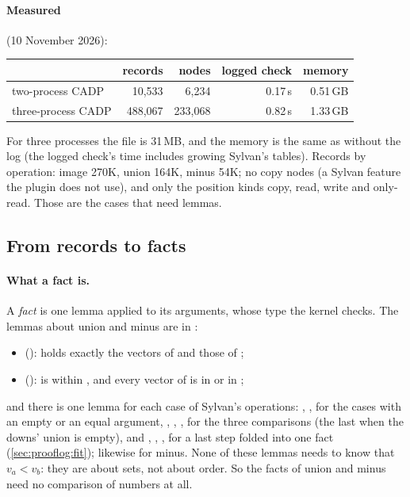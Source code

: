 \paragraph{Measured} (10 November 2026):

\begin{center}
\small
\begin{tabular}{@{}lrrrr@{}}
\toprule
 & records & nodes & logged check & memory \\
\midrule
two-process CADP & 10,533 & 6,234 & 0.17\,s & 0.51\,GB \\
three-process CADP & 488,067 & 233,068 & 0.82\,s & 1.33\,GB \\
\bottomrule
\end{tabular}
\end{center}

For three processes the file is 31\,MB, and the memory is the same as
without the log (the logged check's time includes growing Sylvan's
tables). Records by operation: image 270K, union 164K, minus 54K; no copy
nodes (a Sylvan feature the plugin does not use), and only the position
kinds copy, read, write and only-read. Those are the cases that need
lemmas.

\subsection{From records to facts}\label{sec:prooflog:facts}

\paragraph{What a fact is.} A \emph{fact} is one lemma applied to its
arguments, whose type the kernel checks. The lemmas about union and minus
are in :
\begin{itemize}
\item {} ():  holds exactly
  the vectors of  and those of ;
\item {} ():  is within
  , and every vector of  is in  or in ;
\end{itemize}
and there is one lemma for each case of Sylvan's operations:
, ,  for the cases with an empty or an
equal argument, , , ,  for the
three comparisons (the last when the downs' union is empty), and
, , ,  for a last step
folded into one fact (\cref{sec:prooflog:fit}); likewise  for
minus. None of these lemmas needs to know that
$v_a < v_b$: they are about sets, not about order. So the facts of union
and minus need no comparison of numbers at all.

